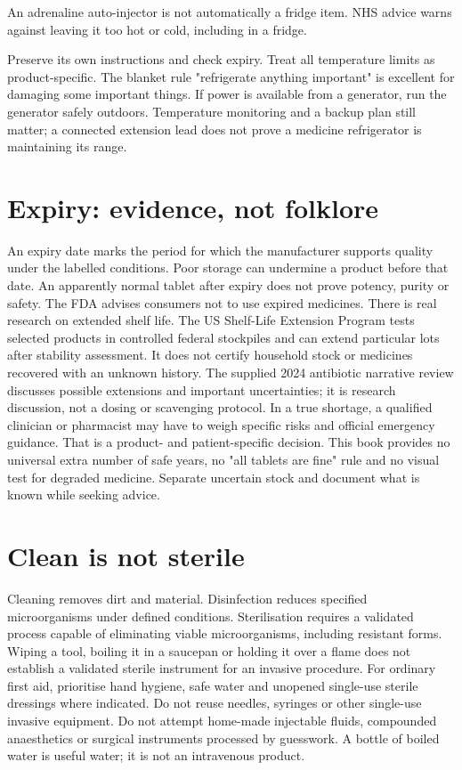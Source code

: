\documentclass[10pt,openright]{book}
\begin{document}
An adrenaline auto-injector is not automatically a fridge item. NHS advice warns against leaving it too hot or cold, including in a fridge.

Preserve its own instructions and check expiry. Treat all temperature limits as product-specific. The blanket rule "refrigerate anything important" is excellent for damaging some important things. If power is available from a generator, run the generator safely outdoors. Temperature monitoring and a backup plan still matter; a connected extension lead does not prove a medicine refrigerator is maintaining its range.

\section*{Expiry: evidence, not folklore}
An expiry date marks the period for which the manufacturer supports quality under the labelled conditions. Poor storage can undermine a product before that date. An apparently normal tablet after expiry does not prove potency, purity or safety. The FDA advises consumers not to use expired medicines. There is real research on extended shelf life. The US Shelf-Life Extension Program tests selected products in controlled federal stockpiles and can extend particular lots after stability assessment. It does not certify household stock or medicines recovered with an unknown history. The supplied 2024 antibiotic narrative review discusses possible extensions and important uncertainties; it is research discussion, not a dosing or scavenging protocol. In a true shortage, a qualified clinician or pharmacist may have to weigh specific risks and official emergency guidance. That is a product- and patient-specific decision. This book provides no universal extra number of safe years, no "all tablets are fine" rule and no visual test for degraded medicine. Separate uncertain stock and document what is known while seeking advice.

\section*{Clean is not sterile}
Cleaning removes dirt and material. Disinfection reduces specified microorganisms under defined conditions. Sterilisation requires a validated process capable of eliminating viable microorganisms, including resistant forms. Wiping a tool, boiling it in a saucepan or holding it over a flame does not establish a validated sterile instrument for an invasive procedure. For ordinary first aid, prioritise hand hygiene, safe water and unopened single-use sterile dressings where indicated. Do not reuse needles, syringes or other single-use invasive equipment. Do not attempt home-made injectable fluids, compounded anaesthetics or surgical instruments processed by guesswork. A bottle of boiled water is useful water; it is not an intravenous product.
\end{document}
